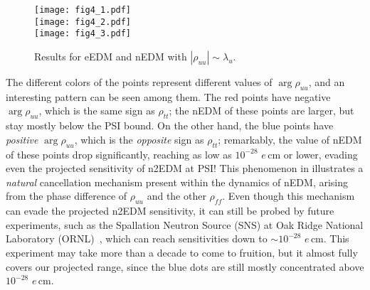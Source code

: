 \begin{figure}[p]
  \centering
  \texttt{[image: fig4\_1.pdf]}\\
  \texttt{[image: fig4\_2.pdf]}\\
  \texttt{[image: fig4\_3.pdf]}
  \caption{Results for eEDM and nEDM with \(|\rho_{uu}| \sim \lambda_{u}\).}
  \label{fig:nEDM-varied}
\end{figure}

The different colors of the points represent different values of \(\arg\rho_{uu} \), and an interesting pattern can be seen among them.
The red points have negative \(\arg\rho_{uu} \), which is the same sign as \(\rho_{tt} \); 
the nEDM of these points are larger, but stay mostly below the PSI bound.
On the other hand, the blue points have \textit{positive} \(\arg\rho_{uu} \), which is the \textit{opposite} sign as \(\rho_{tt} \); 
remarkably, the value of nEDM of these points drop significantly, reaching as low as \(10^{-28} \) \(e\,\mathrm{cm} \) or lower, 
evading even the projected sensitivity of n2EDM at PSI!
This phenomenon in  illustrates a \textit{natural} cancellation mechanism present within the dynamics of nEDM,
arising from the phase difference of \(\rho_{uu} \) and the other \(\rho_{ff} \).
Even though this mechanism can evade the projected n2EDM sensitivity, it can still be probed by future experiments, such as the Spallation Neutron Source (SNS) at Oak Ridge National Laboratory (ORNL)~\cite{SNS-ORNL}, which can reach sensitivities down to \(\sim 10^{-28} \) \(e\,\mathrm{cm} \).
This experiment may take more than a decade to come to fruition, but it almost fully covers our projected range, since the blue dots are still mostly concentrated above \(10^{-28} \) \(e\,\mathrm{cm} \).